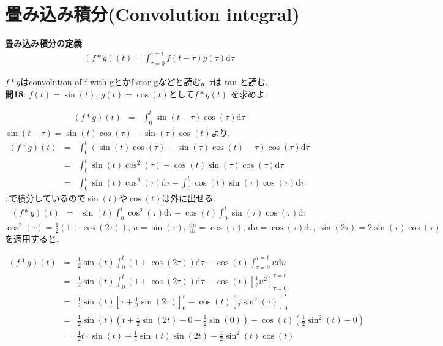 ﻿\documentclass[a4j]{jarticle}
\begin{document}
\section{畳み込み積分(Convolution integral)}

\begin{itembox}[l]{\large{\bf{畳み込み積分の定義}}}
\begin{eqnarray*}
(f * g)(t) = \int_{\tau=0}^{\tau=t}{f(t-\tau)g(\tau)\mathrm{d}\tau}
\end{eqnarray*}
\end{itembox}
\( f*g \)はconvolution of f with gとかf star gなどと読む。\( \tau \)は tau と読む. \\

\noindent
\large{\bf{問18}}: \( f(t)=\sin(t) ,\, g(t)=\cos(t) \text{として} f*g(t) \) を求めよ.

\begin{eqnarray*}
(f*g)(t) &=& \int_0^t{ \sin(t-\tau)\cos(\tau)\mathrm{d}\tau }
\end{eqnarray*}
%
\( \sin(t-\tau)=\sin(t)\cos(\tau)-\sin(\tau)\cos(t) \)より,
%
\begin{eqnarray*}
(f*g)(t) &=& \int_0^t{ (\sin(t)\cos(\tau) - \sin(\tau)\cos(t)-\tau)\cos(\tau)\mathrm{d}\tau } \\
         &=& \int_0^t{ \sin(t)\cos^2(\tau) - \cos(t)\sin(\tau)\cos(\tau)\mathrm{d}\tau } \\
         &=& \int_0^t{ \sin(t)\cos^2(\tau)\mathrm{d}\tau } - \int_0^t{ \cos(t)\sin(\tau)\cos(\tau)\mathrm{d}\tau }
\end{eqnarray*}
\( \tau \)で積分しているので\(\sin(t)\)や\(\cos(t)\)は外に出せる.
\begin{eqnarray*}
(f*g)(t) &=& \sin(t)\int_0^t{ \cos^2(\tau)\mathrm{d}\tau } - \cos(t)\int_0^t{ \sin(\tau)\cos(\tau)\mathrm{d}\tau }
\end{eqnarray*}
%
\( \cos^2(\tau)=\frac{1}{2}(1+\cos(2\tau)) ,\, u=\sin(\tau) ,\, 
\frac{\mathrm{d}u}{\mathrm{d}\tau}=\cos(\tau) ,\, \mathrm{d}u=\cos(\tau)\mathrm{d}\tau ,\, \sin(2\tau)=2\sin(\tau)\cos(\tau) \)を適用すると,

\begin{eqnarray*}
(f*g)(t) &=& \frac{1}{2}\sin(t)\int_0^t{(1+\cos(2\tau))\mathrm{d}\tau} - \cos(t)\int_{\tau=0}^{\tau=t}{u\mathrm{d}u} \\
         &=& \frac{1}{2}\sin(t)\int_0^t{(1+\cos(2\tau))\mathrm{d}\tau} - \cos(t)\left[ \frac{1}{2}u^2 \right]_{\tau=0}^{\tau=t} \\
         &=& \frac{1}{2}\sin(t)\left[ \tau + \frac{1}{2}\sin(2\tau) \right]_0^t - \cos(t) \left[ \frac{1}{2}\sin^2(\tau)\right]_0^t \\
         &=& \frac{1}{2}\sin(t)(t+\frac{1}{2}\sin(2t) - 0 - \frac{1}{2}\sin(0)) - \cos(t)(\frac{1}{2}\sin^2(t) - 0) \\
         &=& \frac{1}{2}t\cdot\sin(t) + \frac{1}{4}\sin(t)\sin(2t) - \frac{1}{2}\sin^2(t)\cos(t) \\
\end{eqnarray*}
\end{document}
